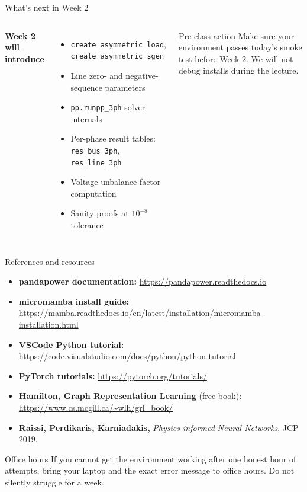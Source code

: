 \documentclass[aspectratio=169,10pt]{beamer}
\newcommand{\code}[1]{\texttt{#1}}
\begin{document}
\begin{frame}{What's next in Week 2}
\begin{columns}[T]
\textbf{Week 2 will introduce}
\begin{itemize}
  \item \code{create\_asymmetric\_load}, \code{create\_asymmetric\_sgen}
  \item Line zero- and negative-sequence parameters
  \item \code{pp.runpp\_3ph} solver internals
  \item Per-phase result tables: \code{res\_bus\_3ph}, \code{res\_line\_3ph}
  \item Voltage unbalance factor computation
  \item Sanity proofs at $10^{-8}$ tolerance
\end{itemize}
\begin{alertblock}{Pre-class action}
Make sure your environment passes today's smoke test before Week 2. We will not debug installs during the lecture.
\end{alertblock}
\end{columns}
\end{frame}

\begin{frame}{References and resources}
\footnotesize
\begin{itemize}
  \item \textbf{pandapower documentation:} \url{https://pandapower.readthedocs.io}
  \item \textbf{micromamba install guide:} \url{https://mamba.readthedocs.io/en/latest/installation/micromamba-installation.html}
  \item \textbf{VSCode Python tutorial:} \url{https://code.visualstudio.com/docs/python/python-tutorial}
  \item \textbf{PyTorch tutorials:} \url{https://pytorch.org/tutorials/}
  \item \textbf{Hamilton, Graph Representation Learning} (free book): \url{https://www.cs.mcgill.ca/~wlh/grl_book/}
  \item \textbf{Raissi, Perdikaris, Karniadakis,} \emph{Physics-informed Neural Networks}, JCP 2019.
\end{itemize}
\vspace{0.8em}
\begin{block}{Office hours}
If you cannot get the environment working after one honest hour of attempts, bring your laptop and the exact error message to office hours. Do not silently struggle for a week.
\end{block}
\end{frame}
\end{document}
